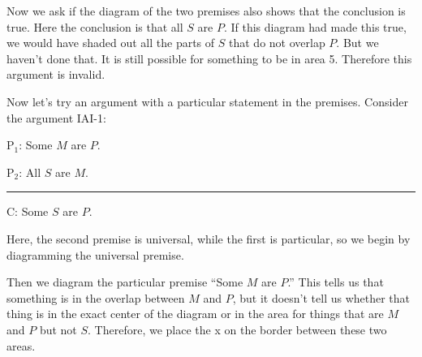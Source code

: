 Now we ask if the diagram of the two premises also shows that the conclusion is true. Here the conclusion is that all $S$ are $P$. If this diagram had made this true, we would have shaded out all the parts of $S$ that do not overlap $P$. But we haven't done that. It is still possible for something to be in area 5. Therefore this argument is invalid. 

Now let's try an argument with a particular statement in the premises. Consider the argument IAI-1:

\begin{earg}
\item[P$_1$:] Some $M$ are $P$.
\item[P$_2$:] All $S$ are $M$.
\vspace{-.5em}
\item [] \rule{0.2\linewidth}{.5pt} 
\item[C:] Some $S$ are $P$.
\end{earg} 

Here, the second premise is universal, while the first is particular, so we begin by diagramming the universal premise.

\begin{center}
\end{center}

Then we diagram the particular premise ``Some $M$ are $P$.'' This tells us that something is in the overlap between $M$ and $P$, but it doesn't tell us whether that thing is in the exact center of the diagram or in the area for things that are $M$ and $P$ but not $S$. Therefore, we place the x on the border between these two areas.

\begin{center}
\end{center}

